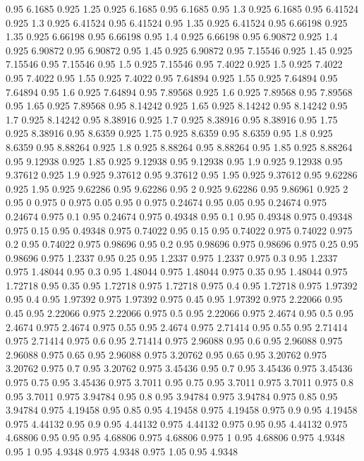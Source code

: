 0.95 6.1685
0.925 1.25
0.925 6.1685
0.95 6.1685
0.95 1.3
0.925 6.1685
0.95 6.41524
0.925 1.3
0.925 6.41524
0.95 6.41524
0.95 1.35
0.925 6.41524
0.95 6.66198
0.925 1.35
0.925 6.66198
0.95 6.66198
0.95 1.4
0.925 6.66198
0.95 6.90872
0.925 1.4
0.925 6.90872
0.95 6.90872
0.95 1.45
0.925 6.90872
0.95 7.15546
0.925 1.45
0.925 7.15546
0.95 7.15546
0.95 1.5
0.925 7.15546
0.95 7.4022
0.925 1.5
0.925 7.4022
0.95 7.4022
0.95 1.55
0.925 7.4022
0.95 7.64894
0.925 1.55
0.925 7.64894
0.95 7.64894
0.95 1.6
0.925 7.64894
0.95 7.89568
0.925 1.6
0.925 7.89568
0.95 7.89568
0.95 1.65
0.925 7.89568
0.95 8.14242
0.925 1.65
0.925 8.14242
0.95 8.14242
0.95 1.7
0.925 8.14242
0.95 8.38916
0.925 1.7
0.925 8.38916
0.95 8.38916
0.95 1.75
0.925 8.38916
0.95 8.6359
0.925 1.75
0.925 8.6359
0.95 8.6359
0.95 1.8
0.925 8.6359
0.95 8.88264
0.925 1.8
0.925 8.88264
0.95 8.88264
0.95 1.85
0.925 8.88264
0.95 9.12938
0.925 1.85
0.925 9.12938
0.95 9.12938
0.95 1.9
0.925 9.12938
0.95 9.37612
0.925 1.9
0.925 9.37612
0.95 9.37612
0.95 1.95
0.925 9.37612
0.95 9.62286
0.925 1.95
0.925 9.62286
0.95 9.62286
0.95 2
0.925 9.62286
0.95 9.86961
0.925 2
0.95 0
0.975 0
0.975 0.05
0.95 0
0.975 0.24674
0.95 0.05
0.95 0.24674
0.975 0.24674
0.975 0.1
0.95 0.24674
0.975 0.49348
0.95 0.1
0.95 0.49348
0.975 0.49348
0.975 0.15
0.95 0.49348
0.975 0.74022
0.95 0.15
0.95 0.74022
0.975 0.74022
0.975 0.2
0.95 0.74022
0.975 0.98696
0.95 0.2
0.95 0.98696
0.975 0.98696
0.975 0.25
0.95 0.98696
0.975 1.2337
0.95 0.25
0.95 1.2337
0.975 1.2337
0.975 0.3
0.95 1.2337
0.975 1.48044
0.95 0.3
0.95 1.48044
0.975 1.48044
0.975 0.35
0.95 1.48044
0.975 1.72718
0.95 0.35
0.95 1.72718
0.975 1.72718
0.975 0.4
0.95 1.72718
0.975 1.97392
0.95 0.4
0.95 1.97392
0.975 1.97392
0.975 0.45
0.95 1.97392
0.975 2.22066
0.95 0.45
0.95 2.22066
0.975 2.22066
0.975 0.5
0.95 2.22066
0.975 2.4674
0.95 0.5
0.95 2.4674
0.975 2.4674
0.975 0.55
0.95 2.4674
0.975 2.71414
0.95 0.55
0.95 2.71414
0.975 2.71414
0.975 0.6
0.95 2.71414
0.975 2.96088
0.95 0.6
0.95 2.96088
0.975 2.96088
0.975 0.65
0.95 2.96088
0.975 3.20762
0.95 0.65
0.95 3.20762
0.975 3.20762
0.975 0.7
0.95 3.20762
0.975 3.45436
0.95 0.7
0.95 3.45436
0.975 3.45436
0.975 0.75
0.95 3.45436
0.975 3.7011
0.95 0.75
0.95 3.7011
0.975 3.7011
0.975 0.8
0.95 3.7011
0.975 3.94784
0.95 0.8
0.95 3.94784
0.975 3.94784
0.975 0.85
0.95 3.94784
0.975 4.19458
0.95 0.85
0.95 4.19458
0.975 4.19458
0.975 0.9
0.95 4.19458
0.975 4.44132
0.95 0.9
0.95 4.44132
0.975 4.44132
0.975 0.95
0.95 4.44132
0.975 4.68806
0.95 0.95
0.95 4.68806
0.975 4.68806
0.975 1
0.95 4.68806
0.975 4.9348
0.95 1
0.95 4.9348
0.975 4.9348
0.975 1.05
0.95 4.9348
